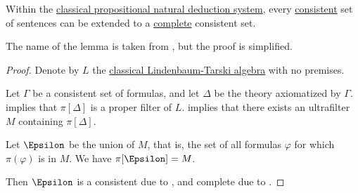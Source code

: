 \begin{lemma}\label{thm:extension_to_complete_consistent_set}
  Within the \hyperref[def:propositional_natural_deduction_system]{classical propositional natural deduction system}, every \hyperref[def:consistent_set_of_sentences]{consistent} set of sentences can be extended to a \hyperref[def:complete_set_of_sentences]{complete} consistent set.
\end{lemma}
\begin{comments}
  \item The name of the lemma is taken from , but the proof is simplified.
\end{comments}
\begin{proof}
  Denote by \( L \) the \hyperref[thm:lindenbaum_tarski_algebras]{classical Lindenbaum-Tarski algebra} with no premises.

  Let \( \Gamma \) be a consistent set of formulas, and let \( \Delta \) be the theory axiomatized by \( \Gamma \).  implies that \( \pi[\Delta] \) is a proper filter of \( L \).  implies that there exists an ultrafilter \( M \) containing \( \pi[\Delta] \).

  Let \( \Epsilon \) be the union of \( M \), that is, the set of all formulas \( \varphi \) for which \( \pi(\varphi) \) is in \( M \). We have \( \pi[\Epsilon] = M \).

  Then \( \Epsilon \) is a consistent due to , and complete due to .
\end{proof}

